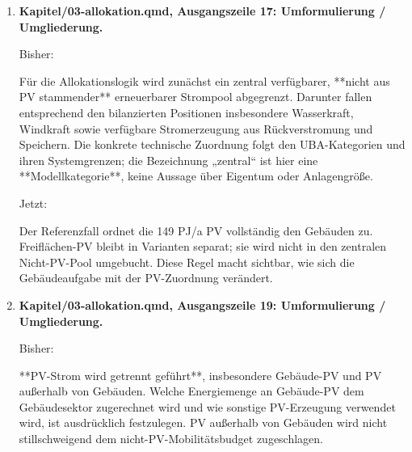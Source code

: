 \documentclass[
  ngerman,
  a4paper,
  DIV=11]{scrreprt}
\newenvironment{Shaded}{\begin{snugshade}}{\end{snugshade}}
\newcommand{\NormalTok}[1]{\textcolor[rgb]{0.00,0.23,0.31}{#1}}
\begin{document}
\begin{enumerate}
  Bisher:

\begin{Shaded}
\begin{Highlighting}[]
\NormalTok{\#\# Zentrale und dezentrale erneuerbare Erzeugung}
\end{Highlighting}
\end{Shaded}

  Jetzt:

\begin{Shaded}
\begin{Highlighting}[]
\NormalTok{\#\# Erzeugungszuordnung und Prioritäten}
\end{Highlighting}
\end{Shaded}
\item
  \textbf{Kapitel/03-allokation.qmd, Ausgangszeile 17: Umformulierung /
  Umgliederung.}

  Bisher:

\begin{Shaded}
\begin{Highlighting}[]
\NormalTok{Für die Allokationslogik wird zunächst ein zentral verfügbarer, **nicht aus PV stammender** erneuerbarer Strompool abgegrenzt. Darunter fallen entsprechend den bilanzierten Positionen insbesondere Wasserkraft, Windkraft sowie verfügbare Stromerzeugung aus Rückverstromung und Speichern. Die konkrete technische Zuordnung folgt den UBA{-}Kategorien und ihren Systemgrenzen; die Bezeichnung „zentral“ ist hier eine **Modellkategorie**, keine Aussage über Eigentum oder Anlagengröße.}
\end{Highlighting}
\end{Shaded}

  Jetzt:

\begin{Shaded}
\begin{Highlighting}[]
\NormalTok{Der Referenzfall ordnet die 149 PJ/a PV vollständig den Gebäuden zu. Freiflächen{-}PV bleibt in Varianten separat; sie wird nicht in den zentralen Nicht{-}PV{-}Pool umgebucht. Diese Regel macht sichtbar, wie sich die Gebäudeaufgabe mit der PV{-}Zuordnung verändert.}
\end{Highlighting}
\end{Shaded}
\item
  \textbf{Kapitel/03-allokation.qmd, Ausgangszeile 19: Umformulierung /
  Umgliederung.}

  Bisher:

\begin{Shaded}
\begin{Highlighting}[]
\NormalTok{**PV{-}Strom wird getrennt geführt**, insbesondere Gebäude{-}PV und PV außerhalb von Gebäuden. Welche Energiemenge an Gebäude{-}PV dem Gebäudesektor zugerechnet wird und wie sonstige PV{-}Erzeugung verwendet wird, ist ausdrücklich festzulegen. PV außerhalb von Gebäuden wird nicht stillschweigend dem nicht{-}PV{-}Mobilitätsbudget zugeschlagen.}
\end{Highlighting}
\end{Shaded}


\end{enumerate}
\end{document}
